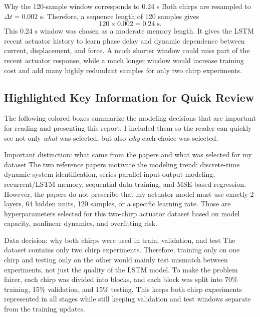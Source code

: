 \documentclass[11pt]{article}
\begin{document}
\begin{trainingdecisionbox}{Why the 120-sample window corresponds to 0.24 s}
Both chirps are resampled to $\Delta t=0.002$ s. Therefore, a sequence length of 120 samples gives
\begin{equation}
120\times0.002=0.24\;\text{s}.
\end{equation}
This 0.24 s window was chosen as a moderate memory length. It gives the LSTM recent actuator history to learn phase delay and dynamic dependence between current, displacement, and force. A much shorter window could miss part of the recent actuator response, while a much longer window would increase training cost and add many highly redundant samples for only two chirp experiments.
\end{trainingdecisionbox}

\subsection{Highlighted Key Information for Quick Review}
The following colored boxes summarize the modeling decisions that are important for reading and presenting this report. I included them so the reader can quickly see not only \emph{what} was selected, but also \emph{why} each choice was selected.

\begin{paperdecisionbox}{Important distinction: what came from the papers and what was selected for my dataset}
The two reference papers motivate the modeling trend: discrete-time dynamic system identification, series-parallel input-output modeling, recurrent/LSTM memory, sequential data training, and MSE-based regression. However, the papers do not prescribe that my actuator model must use exactly 2 layers, 64 hidden units, 120 samples, or a specific learning rate. Those are hyperparameters selected for this two-chirp actuator dataset based on model capacity, nonlinear dynamics, and overfitting risk.
\end{paperdecisionbox}

\begin{datadecisionbox}{Data decision: why both chirps were used in train, validation, and test}
The dataset contains only two chirp experiments. Therefore, training only on one chirp and testing only on the other would mainly test mismatch between experiments, not just the quality of the LSTM model. To make the problem fairer, each chirp was divided into blocks, and each block was split into 70\% training, 15\% validation, and 15\% testing. This keeps both chirp experiments represented in all stages while still keeping validation and test windows separate from the training updates.
\end{datadecisionbox}
\end{document}
